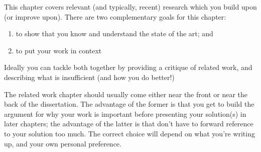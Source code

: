 \newpage

This chapter covers relevant (and typically, recent) research 
which you build upon (or improve upon). There are two complementary 
goals for this chapter: 
\begin{enumerate} 
  \item to show that you know and understand the state of the art; and 
  \item to put your work in context
\end{enumerate} 

Ideally you can tackle both together by providing a critique of
related work, and describing what is insufficient (and how you do
better!)

The related work chapter should usually come either near the front or
near the back of the dissertation. The advantage of the former is that
you get to build the argument for why your work is important before
presenting your solution(s) in later chapters; the advantage of the
latter is that don't have to forward reference to your solution too
much. The correct choice will depend on what you're writing up, and
your own personal preference.